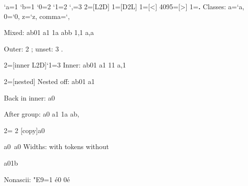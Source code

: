 \documentclass{article}
\begin{document}
\XeTeXcharclass`a=1 \XeTeXcharclass`b=1 \XeTeXcharclass`0=2 \XeTeXcharclass`1=2 \XeTeXcharclass`,=3
 2={[L2D]}  1={[D2L]}
 1={[<]}  4095={[>]}
 1={\textbf{.}}
Classes: a=\the\XeTeXcharclass`a, 0=\the\XeTeXcharclass`0, z=\the\XeTeXcharclass`z, comma=\the\XeTeXcharclass`,\par
Mixed: ab01 a1 1a abb 1,1 a,a\par
Outer: \the{} 2 ; unset: \the{} 3 .\par
{ 2={[inner L2D]}\XeTeXcharclass`1=3
 Inner: ab01 a1 11 a,1 \par
 { 2={[nested]} Nested off: ab01 a1\par}
 Back in inner: a0\par}
After group: a0 a1 1a ab,\par
{ 2=\expandafter{\the{} 2 [copy]}a0\par}
\hbox{a0}\hbox{ a0}
Widths: with tokens \the{} without \the{}\par
\hbox{a\hbox{0}1b}\par
Nonascii: \XeTeXcharclass"E9=1 é0 0é\par
\end{document}

